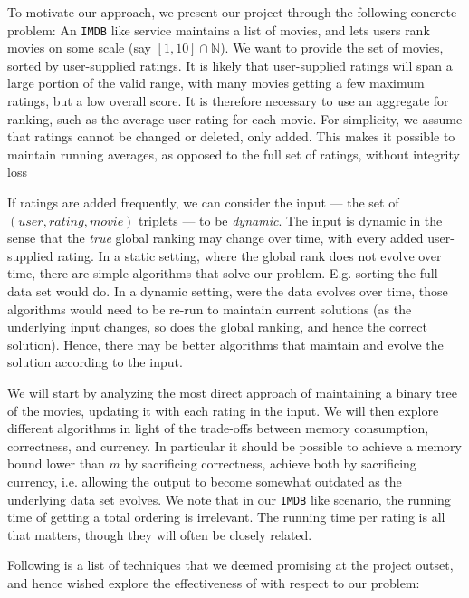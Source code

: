 \documentclass[a4paper, titlepage]{report}
\renewcommand{\%}{\scalebox{.9}{\oldpct}}
\begin{document}
To motivate our approach, we present our project through the following concrete
problem: An \texttt{IMDB} like service maintains a list of movies, and lets
users rank movies on some scale (say $\left[1,10\right]\cap \mathbb{N}$). We
want to provide the set of movies, sorted by user-supplied ratings. It is likely
that  user-supplied ratings will span a large portion of the valid range, with
many movies getting a few maximum ratings, but a low overall score. It is
therefore necessary to use an aggregate for ranking, such as the average
user-rating for each movie. For simplicity, we assume that ratings cannot be
changed or deleted, only added. This makes it possible to maintain running
averages, as
opposed to the full set of ratings, without integrity loss

If ratings are added frequently, we can consider the input --- the set of
$(user, rating, movie)$ triplets --- to be \textit{dynamic}. The input is dynamic
in the sense that the \textit{true} global ranking may change over time, with
every added user-supplied rating. 
In a static setting, where the global rank does not evolve over time, there are
simple algorithms that solve our problem. E.g. sorting the full data set would
do.
In a dynamic setting, were the data evolves over time,
those algorithms would need to be re-run to maintain current solutions (as the
underlying input changes, so does the global ranking, and hence the correct
solution). Hence, there may be better algorithms that maintain and evolve the
solution according to the input.

We will start by analyzing the most direct approach of maintaining a binary
tree of the movies, updating it with each rating in the input.
We will then explore different algorithms in light of the trade-offs between
memory consumption, correctness, and currency. In particular it should be
possible to achieve a memory bound lower than $m$ by sacrificing correctness,
achieve both by sacrificing currency, i.e. allowing the output to become
somewhat outdated as the underlying data set evolves. We note that in our
\texttt{IMDB} like scenario, the running time of getting a total ordering is
irrelevant. The running time per rating is all that matters, though they will
often be closely related.

Following is a list of techniques that we deemed promising at the project
outset, and hence wished explore the effectiveness of with respect to our
problem:
\end{document}
